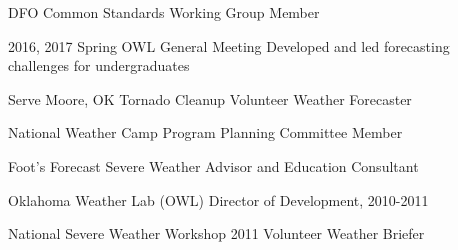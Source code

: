 \begin{cvskills}
  \cvskill
    {DFO Common Standards Working Group} %
    {Member} %

  \cvskill
    {2016, 2017 Spring OWL General Meeting} %
    {Developed and led forecasting challenges for undergraduates} %

  \cvskill
    {Serve Moore, OK Tornado Cleanup} %
    {Volunteer Weather Forecaster} %

  \cvskill
    {National Weather Camp Program Planning Committee} %
    {Member} %
    
  \cvskill
    {Foot's Forecast} %
    {Severe Weather Advisor and Education Consultant} %
    
  \cvskill
    {Oklahoma Weather Lab (OWL)}
    {Director of Development, 2010-2011}
    
  \cvskill
    {National Severe Weather Workshop 2011} %
    {Volunteer Weather Briefer} %
\end{cvskills}
